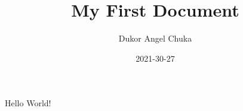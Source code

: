 \documentclass{article}
\title{My First Document}
\date{2021-30-27}
\author{Dukor Angel Chuka}
\begin{document}
	\maketitle
	\newpage
	Hello World!
\end{document}
